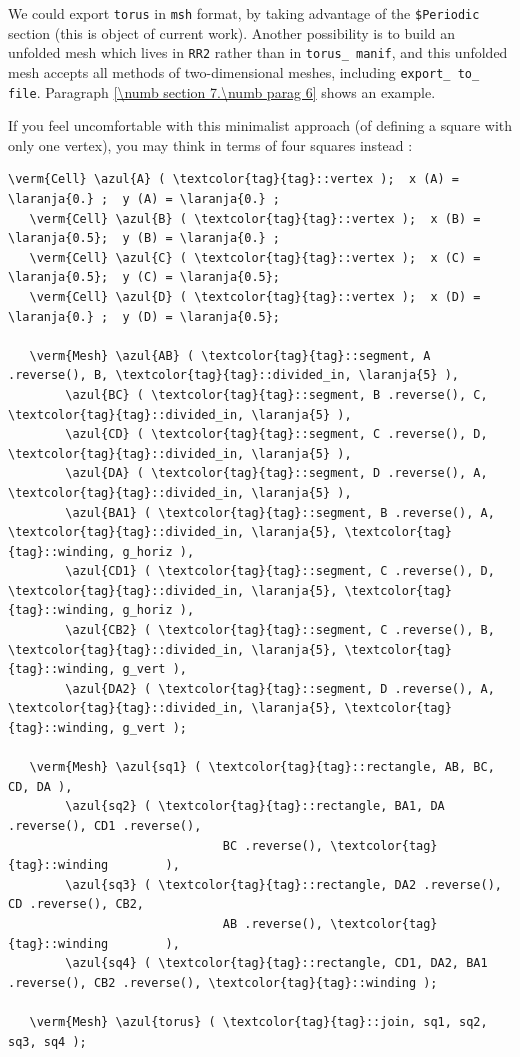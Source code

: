 We could export {\small\tt torus} in {\small\tt msh} format, by taking advantage of the
{\small\tt \$Periodic} section (this is object of current work).
Another possibility is to build an unfolded mesh which lives in {\small\tt RR2} rather than in
{\small\tt torus\_\,manif}, and this unfolded mesh accepts all methods of two-dimensional
meshes, including {\small\tt export\_\,to\_\,file}.
Paragraph \ref{\numb section 7.\numb parag 6} shows an example.

If you feel uncomfortable with this minimalist approach (of defining a square with only one vertex), 
you may think in terms of four squares instead :

\begin{Verbatim}[commandchars=\\\{\},formatcom=\small\tt,
   baselinestretch=0.94,framesep=2mm                      ]
   \verm{Cell} \azul{A} ( \textcolor{tag}{tag}::vertex );  x (A) = \laranja{0.} ;  y (A) = \laranja{0.} ;
   \verm{Cell} \azul{B} ( \textcolor{tag}{tag}::vertex );  x (B) = \laranja{0.5};  y (B) = \laranja{0.} ;
   \verm{Cell} \azul{C} ( \textcolor{tag}{tag}::vertex );  x (C) = \laranja{0.5};  y (C) = \laranja{0.5};
   \verm{Cell} \azul{D} ( \textcolor{tag}{tag}::vertex );  x (D) = \laranja{0.} ;  y (D) = \laranja{0.5};

   \verm{Mesh} \azul{AB} ( \textcolor{tag}{tag}::segment, A .reverse(), B, \textcolor{tag}{tag}::divided_in, \laranja{5} ),
        \azul{BC} ( \textcolor{tag}{tag}::segment, B .reverse(), C, \textcolor{tag}{tag}::divided_in, \laranja{5} ),
        \azul{CD} ( \textcolor{tag}{tag}::segment, C .reverse(), D, \textcolor{tag}{tag}::divided_in, \laranja{5} ),
        \azul{DA} ( \textcolor{tag}{tag}::segment, D .reverse(), A, \textcolor{tag}{tag}::divided_in, \laranja{5} ),
        \azul{BA1} ( \textcolor{tag}{tag}::segment, B .reverse(), A, \textcolor{tag}{tag}::divided_in, \laranja{5}, \textcolor{tag}{tag}::winding, g_horiz ),
        \azul{CD1} ( \textcolor{tag}{tag}::segment, C .reverse(), D, \textcolor{tag}{tag}::divided_in, \laranja{5}, \textcolor{tag}{tag}::winding, g_horiz ),
        \azul{CB2} ( \textcolor{tag}{tag}::segment, C .reverse(), B, \textcolor{tag}{tag}::divided_in, \laranja{5}, \textcolor{tag}{tag}::winding, g_vert ),
        \azul{DA2} ( \textcolor{tag}{tag}::segment, D .reverse(), A, \textcolor{tag}{tag}::divided_in, \laranja{5}, \textcolor{tag}{tag}::winding, g_vert );

   \verm{Mesh} \azul{sq1} ( \textcolor{tag}{tag}::rectangle, AB, BC, CD, DA ),
        \azul{sq2} ( \textcolor{tag}{tag}::rectangle, BA1, DA .reverse(), CD1 .reverse(),
                              BC .reverse(), \textcolor{tag}{tag}::winding        ),
        \azul{sq3} ( \textcolor{tag}{tag}::rectangle, DA2 .reverse(), CD .reverse(), CB2,
                              AB .reverse(), \textcolor{tag}{tag}::winding        ),
        \azul{sq4} ( \textcolor{tag}{tag}::rectangle, CD1, DA2, BA1 .reverse(), CB2 .reverse(), \textcolor{tag}{tag}::winding );
	
   \verm{Mesh} \azul{torus} ( \textcolor{tag}{tag}::join, sq1, sq2, sq3, sq4 );
\end{Verbatim}

